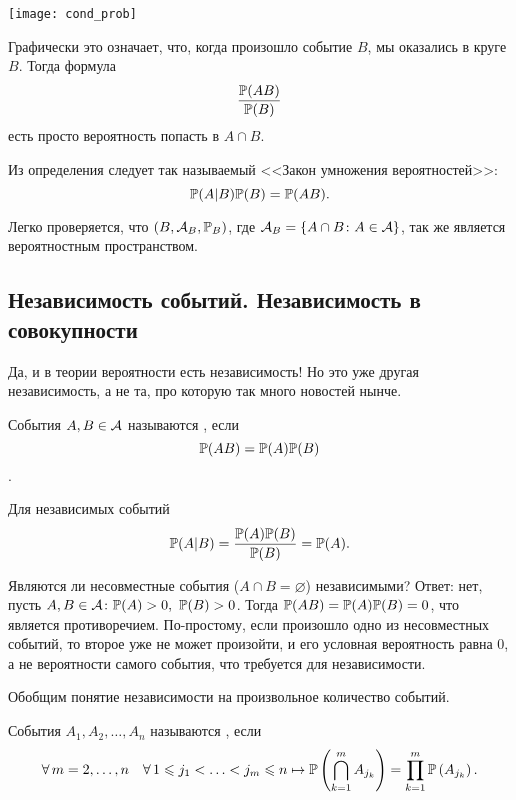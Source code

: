 \documentclass[../TV&MS.tex]{subfiles}
\begin{document}
\noindent
\parbox[b][3 cm][t]{40mm}{\texttt{[image: cond\_prob]}}
\hfill
\parbox[b][3 cm][t]{80mm}{
	Графически это означает, что, когда произошло событие $B$, мы оказались в круге $B$. 
	Тогда формула $$\frac{\mathbb{P}(AB)}{\mathbb{P}(B)}$$ есть просто вероятность попасть в $A\cap B$.
}

\newpage

Из определения следует так называемый <<Закон умножения вероятностей>>:
$$\mathbb{P}(A|B)\mathbb{P}(B)=\mathbb{P}(AB).$$

Легко проверяется, что $(B, \mathcal{A}_B, \mathbb{P}_B)$, где $\mathcal{A}_B = \left\{ A \cap B \colon A \in \mathcal{A} \right\}$, 
так же является вероятностным пространством.


\subsection{Независимость событий. Независимость в совокупности}

\qquad Да, и в теории вероятности есть независимость! Но это уже другая независимость, 
а не та, про которую так много новостей нынче.

\begin{Def}
События $A, B \in \mathcal{A}$ называются , если 
$$\mathbb{P}(AB) = \mathbb{P}(A) \mathbb{P}(B)$$.
\end{Def}

Для независимых событий $$\mathbb{P}(A|B) = \frac{\mathbb{P}(A)\mathbb{P}(B)}{\mathbb{P}(B)} = \mathbb{P}(A).$$

\begin{Ex}
Являются ли несовместные события ($A\cap B = \varnothing$) независимыми? 
Ответ: нет, пусть  $A, B \in \mathcal{A} \colon \mathbb{P}(A) > 0, \ \mathbb{P}(B) > 0$. 
Тогда $\mathbb{P}(AB) = \mathbb{P}(A)\mathbb{P}(B) = 0$, что является противоречием. По-простому, 
если произошло одно из несовместных событий, то второе уже не может произойти, 
и его условная вероятность равна $0$, а не вероятности самого события, 
что требуется для независимости.
\end{Ex}

Обобщим понятие независимости на произвольное количество событий.

\begin{Def}
События $A_1, A_2, \dots, A_n$ называются , если 
$$\forall\, m = 2, \dots, n \quad \forall\, 1 \leqslant j_1 < \ldots < j_m \leqslant n \mapsto 
\mathbb{P}\left(\bigcap_{k=1}^{m}A_{j_k}\right)=\prod_{k=1}^{m} \mathbb{P}\left(A_{j_k}\right).$$
\end{Def}
\end{document}
